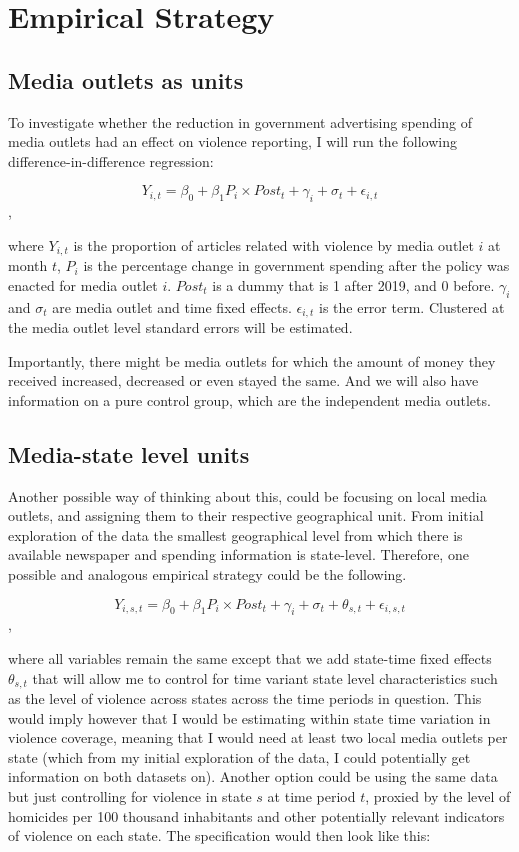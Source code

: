\section{Empirical Strategy}
\label{sec:emp_strat}
\subsection{Media outlets as units}


To investigate whether the reduction in government advertising spending of media outlets had an effect on violence reporting, I will run the following difference-in-difference regression: 

$$Y_{i, t} = \beta_0 + \beta_1 P_{i}\times Post_{t} + \gamma_i + \sigma_t + \epsilon_{i, t} $$,

\noindent where $Y_{i, t}$ is the proportion of articles related with violence by media outlet $i$ at month $t$, $P_{i}$ is the percentage change in government spending after the policy was enacted for media outlet $i$. $Post_{t}$ is a dummy that is 1 after 2019, and 0 before. $\gamma_i$ and $\sigma_t$ are media outlet and time fixed effects. $\epsilon_{i, t}$ is the error term. Clustered at the media outlet level standard errors will be estimated. 

Importantly, there might be media outlets for which the amount of money they received increased, decreased or even stayed the same. And we will also have information on a pure control group, which are the independent media outlets. 

\subsection{Media-state level units}

Another possible way of thinking about this, could be focusing on local media outlets, and assigning them to their respective geographical unit. From initial exploration of the data the smallest geographical level from which there is available newspaper and spending information is state-level. Therefore, one possible and analogous empirical strategy could be the following.

$$Y_{i, s, t} = \beta_0 + \beta_1 P_{i}\times Post_{t} + \gamma_i + \sigma_t + \theta_{s, t} + \epsilon_{i, s, t} $$, 

\noindent where all variables remain the same except that we add state-time fixed effects $\theta_{s, t}$ that will allow me to control for time variant state level characteristics such as the level of violence across states across the time periods in question. This would imply however that I would be estimating within state time variation in violence coverage, meaning that I would need at least two local media outlets per state (which from my initial exploration of the data, I could potentially get information on both datasets on). Another option could be using the same data but just controlling for violence in state $s$ at time period $t$, proxied by the level of homicides per 100 thousand inhabitants and other potentially relevant indicators of violence on each state. The specification would then look like this: 

